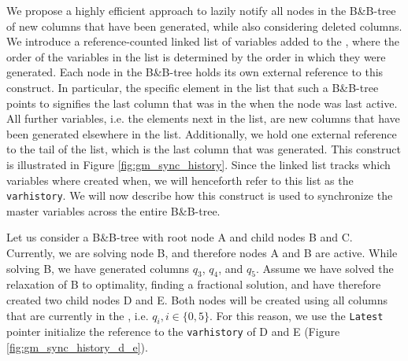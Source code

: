 We propose a highly efficient approach to lazily notify all nodes in the B\&B-tree of new columns that have been generated, while also considering deleted columns. We introduce a reference-counted linked list of variables added to the \RMP{}, where the order of the variables in the list is determined by the order in which they were generated. Each node in the B\&B-tree holds its own external reference to this construct. In particular, the specific element in the list that such a B\&B-tree points to signifies the last column that was in the \RMP{} when the node was last active. All further variables, i.e. the elements next in the list, are new columns that have been generated elsewhere in the list. Additionally, we hold one external reference to the tail of the list, which is the last column that was generated. This construct is illustrated in Figure \ref{fig:gm_sync_history}. Since the linked list tracks which variables where created when, we will henceforth refer to this list as the \texttt{varhistory}. We will now describe how this construct is used to synchronize the master variables across the entire B\&B-tree.

Let us consider a B\&B-tree with root node A and child nodes B and C. Currently, we are solving node B, and therefore nodes A and B are active. While solving B, we have generated columns $q_3$, $q_4$, and $q_5$. Assume we have solved the relaxation of B to optimality, finding a fractional solution, and have therefore created two child nodes D and E. Both nodes will be created using all columns that are currently in the \RMP{}, i.e. $q_i, i \in \{0, 5\}$. For this reason, we use the \texttt{Latest} pointer initialize the reference to the \texttt{varhistory} of D and E (Figure \ref{fig:gm_sync_history_d_e}).

